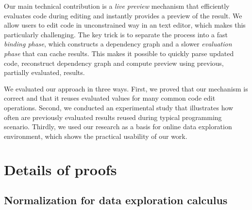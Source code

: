 \documentclass[english,submission]{programming}
\theoremstyle{plain}
\theoremstyle{definition}
\begin{document}
Our main technical contribution is a \emph{live preview} mechanism that efficiently evaluates
code during editing and instantly provides a preview of the result. We allow users to edit code
in unconstrained way in an text editor, which makes this particularly challenging. The key trick
is to separate the process into a fast \emph{binding phase}, which constructs a dependency graph
and a slower \emph{evaluation phase} that can cache results. This makes it possible to quickly parse
updated code, reconstruct dependency graph and compute preview using previous, partially
evaluated, results.

We evaluated our approach in three ways. First, we proved that our mechanism is correct and
that it reuses evaluated values for many common code edit operations. Second, we conducted an
experimental study that illustrates how often are previously evaluated results reused during
typical programming scenario. Thirdly, we used our research as a basis for online data exploration
environment, which shows the practical usability of our work.


\printbibliography


\newpage
\appendix

\section{Details of proofs}

\subsection{Normalization for data exploration calculus}
\label{sec:app-normalization}
\end{document}
